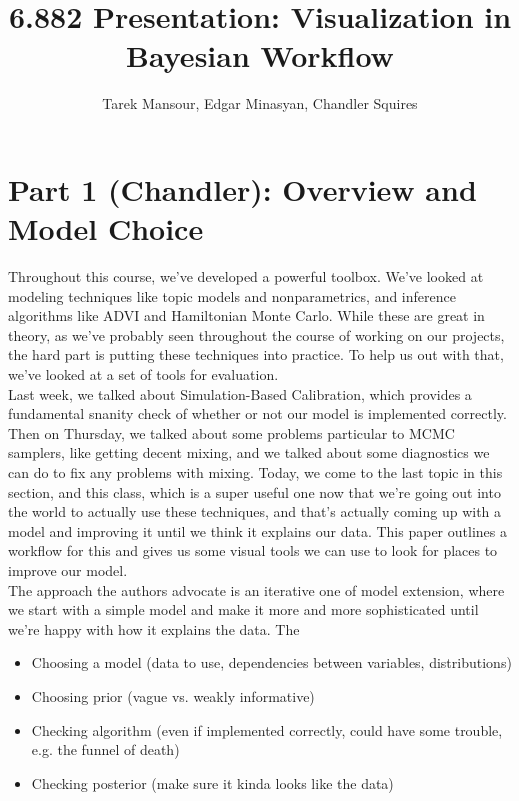\documentclass[]{article}
\title{6.882 Presentation: Visualization in Bayesian Workflow}
\author{Tarek Mansour, Edgar Minasyan, Chandler Squires}
\date{}
\begin{document}
\maketitle
\thispagestyle{empty}

\section*{Part 1 (Chandler): Overview and Model Choice}

Throughout this course, we've developed a powerful toolbox. We've looked at modeling techniques like topic models and nonparametrics, and inference algorithms like ADVI and Hamiltonian Monte Carlo. While these are great in theory, as we've probably seen throughout the course of working on our projects, the hard part is putting these techniques into practice. To help us out with that, we've looked at a set of tools for evaluation.
\\

Last week, we talked about Simulation-Based Calibration, which provides a fundamental snanity check of whether or not our model is implemented correctly. Then on Thursday, we talked about some problems particular to MCMC samplers, like getting decent mixing, and we talked about some diagnostics we can do to fix any problems with mixing. Today, we come to the last topic in this section, and this class, which is a super useful one now that we're going out into the world to actually use these techniques, and that's actually coming up with a model and improving it until we think it explains our data. This paper outlines a workflow for this and gives us some visual tools we can use to look for places to improve our model.
\\

The approach the authors advocate is an iterative one of model extension, where we start with a simple model and make it more and more sophisticated until we're happy with how it explains the data. The 
\begin{itemize}
	\item Choosing a model (data to use, dependencies between variables, distributions)
	\item Choosing prior (vague vs. weakly informative)
	\item Checking algorithm (even if implemented correctly, could have some trouble, e.g. the funnel of death)
	\item Checking posterior (make sure it kinda looks like the data)
\end{itemize}
\end{document}
